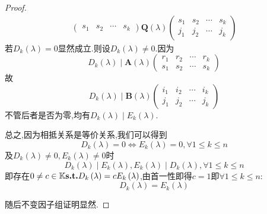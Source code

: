 {\begin{proof}
\begin{align*}
\begin{pmatrix}
                                          s_1 & s_2 & \cdots & s_k
                                      \end{pmatrix}
            \bm{Q}\left(\lambda\right)\begin{pmatrix}
                                          s_1 & s_2 & \cdots & s_k \\
                                          j_1 & j_2 & \cdots & j_k
                                      \end{pmatrix}
        \end{align*}
        若$D_k\left(\lambda\right)=0$显然成立.则设$D_k\left(\lambda\right)\neq 0.$因为
        \[
            D_k\left(\lambda\right)\mid \bm{A}\left(\lambda\right)\begin{pmatrix}
                r_1 & r_2 & \cdots & r_k \\
                s_1 & s_2 & \cdots & s_k
            \end{pmatrix}
        \]故
        \[
            D_k\left(\lambda\right)\mid \bm{B}\left(\lambda\right)\begin{pmatrix}
                i_1 & i_2 & \cdots & i_k \\
                j_1 & j_2 & \cdots & j_k
            \end{pmatrix}
        \]不管后者是否为零,均有$D_k\left(\lambda\right)\mid E_k\left(\lambda\right)$.

        总之,因为相抵关系是等价关系,我们可以得到
        \[
            D_k\left(\lambda\right)=0\Longleftrightarrow
            E_k\left(\lambda\right)=0,\forall 1\leqslant k\leqslant n
        \]及$D_k\left(\lambda\right)\neq 0,E_k\left(\lambda\right)\neq 0$时
        \[
            D_k\left(\lambda\right)\mid E_k\left(\lambda\right),E_k\left(\lambda\right)\mid D_k\left(\lambda\right),\forall 1\leqslant k\leqslant n
        \]即存在$0\neq c\in\mathbb{K} \textup{\bfseries{s.t.}} D_k\left(\lambda\right)=cE_k\left(\lambda\right)$,由首一性即得$c=1$即$\forall1\leqslant k\leqslant n$:
        \[D_k\left(\lambda\right)=E_k\left(\lambda\right)\]

        随后不变因子组证明显然.
    \end{proof}
}

